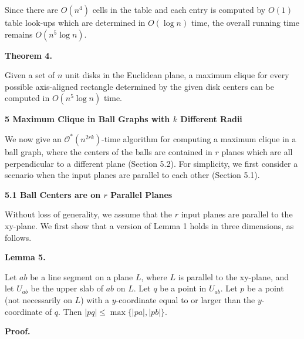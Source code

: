 \par
Since there are $O(n^{4})$ cells in the table and each entry is computed by $O(1)$ table look-ups which are determined in $O(\log n)$ time, the overall running time remains $O(n^{5}\log n)$.
\par
\par
\par\medskip\noindent\textbf{Theorem 4.}\par
Given a set of $n$ unit disks in the Euclidean plane, a maximum clique for every possible axis-aligned rectangle determined by the given disk centers can be computed in $O(n^{5}\log n)$ time.
\par
\par
\par
\par\medskip\noindent\textbf{5 Maximum Clique in Ball Graphs with $k$ Different Radii}\par
We now give an $\mathcal{O}^{*}(n^{2rk})$-time algorithm for computing a maximum clique in a ball graph, where the centers of the balls are contained in $r$ planes which are all perpendicular to a different plane (Section 5.2). For simplicity, we first consider a scenario when the input planes are parallel to each other (Section 5.1).
\par
\par
\par\medskip\noindent\textbf{5.1 Ball Centers are on $r$ Parallel Planes}\par
Without loss of generality, we assume that the $r$ input planes are parallel to the xy-plane. We first show that a version of Lemma 1 holds in three dimensions, as follows.
\par
\par
\par\medskip\noindent\textbf{Lemma 5.}\par
Let $ab$ be a line segment on a plane $L$, where $L$ is parallel to the xy-plane, and let $U_{ab}$ be the upper slab of $ab$ on $L$. Let $q$ be a point in $U_{ab}$. Let $p$ be a point (not necessarily on $L$) with a $y$-coordinate equal to or larger than the $y$-coordinate of $q$. Then $|pq|\leq\max\{|pa|,|pb|\}$.
\par
\par
\par
\par\medskip\noindent\textbf{Proof.}\par
